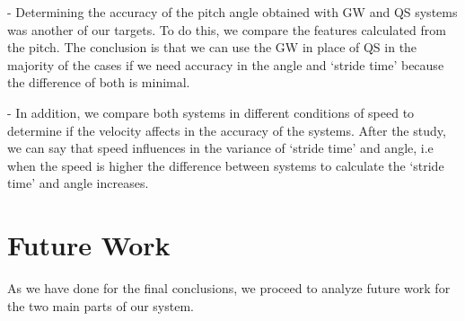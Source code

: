 \begin{itemize}
-	Determining the accuracy of the pitch angle obtained with GW and QS systems was another of our targets. To do this, we compare the features calculated from the pitch. The conclusion is that we can use the GW in place of QS in the majority of the cases if we need accuracy in the angle and ‘stride time’ because the difference of both is minimal.

-	In addition, we compare both systems in different conditions of speed to determine if the velocity affects in the accuracy of the systems. After the study, we can say that speed influences in the variance of ‘stride time’ and angle, i.e when the speed is higher the difference between systems to calculate the ‘stride time’ and angle increases. 
\end{itemize}

\section{Future Work}
As we have done for the final conclusions, we proceed to analyze future work for the two main parts of our system.

